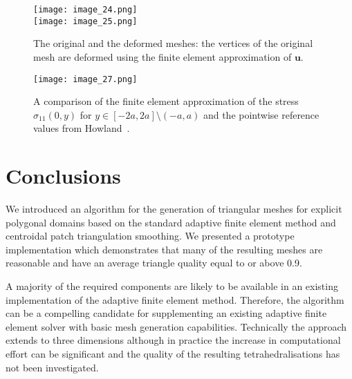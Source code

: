 \documentclass[12pt]{rmstyle}
\begin{document}
\begin{figure}
  \centering
  \texttt{[image: image\_24.png]}\\
  \texttt{[image: image\_25.png]}
  \caption{The original and the deformed meshes: the vertices of the original mesh are deformed using the
  finite element approximation of $\boldsymbol{u}$.}
  \label{fig:kirsch}
\end{figure}

\begin{figure}
  \centering
  \texttt{[image: image\_27.png]}
  \caption{A comparison of the finite element approximation of the stress $\sigma_{11}(0, y)$ for $y \in [-2a, 2a] \setminus (-a, a)$
  and the pointwise reference values from Howland~\cite{howland1930stresses}.}
  \label{fig:kirsch2}
\end{figure}

\section{Conclusions}
\label{sec:org615e973}

We introduced an algorithm for the generation of triangular meshes for explicit
polygonal domains based on the standard adaptive finite element method and
centroidal patch triangulation smoothing.  We presented a prototype
implementation which demonstrates that many of the resulting
meshes are reasonable and have an average triangle quality equal to or above
0.9.

A majority of the required components are likely to be available in an
existing implementation of the adaptive finite element method.  Therefore, the algorithm
can be a compelling candidate for supplementing an existing adaptive finite element solver 
with basic mesh generation capabilities.
Technically the approach extends to three dimensions although in practice the
increase in computational effort can be significant and the quality of the
resulting tetrahedralisations has not been investigated.



\end{document}
